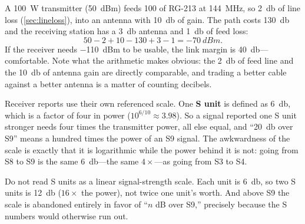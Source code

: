 \begin{workedbox}
A \SI{100}{\watt} transmitter (\SI{50}{dBm}) feeds \SI{100}{\foot} of RG-213 at
\SI{144}{\mega\hertz}, so \SI{2}{\decibel} of line loss (\cref{sec:lineloss}), into
an antenna with \SI{10}{\decibel} of gain. The path costs \SI{130}{\decibel} and the
receiving station has a \SI{3}{\decibel} antenna and \SI{1}{\decibel} of feed loss:
\[
50-2+10-130+3-1=\SI{-70}{dBm}.
\]
If the receiver needs \SI{-110}{dBm} to be usable, the link margin is
\SI{40}{\decibel}---comfortable. Note what the arithmetic makes obvious: the
\SI{2}{\decibel} of feed line and the \SI{10}{\decibel} of antenna gain are directly
comparable, and trading a better cable against a better antenna is a matter of
counting decibels.
\end{workedbox}

Receiver reports use their own referenced scale. One \textbf{S unit} is defined as
\SI{6}{\decibel}, which is a factor of four in power (\(10^{6/10}\approx3.98\)). So a
signal reported one S unit stronger needs four times the transmitter power, all else
equal, and ``\SI{20}{\decibel} over S9'' means a hundred times the power of an S9
signal. The awkwardness of the scale is exactly that it is logarithmic while the
power behind it is not: going from S8 to S9 is the same \SI{6}{\decibel}---the same
\(4\times\)---as going from S3 to S4.

\begin{mistakebox}
Do not read S units as a linear signal-strength scale. Each unit is
\SI{6}{\decibel}, so two S units is \SI{12}{\decibel} (\(16\times\) the power), not
twice one unit's worth. And above S9 the scale is abandoned entirely in favor of
``\(n\) dB over S9,'' precisely because the S numbers would otherwise run out.
\end{mistakebox}

